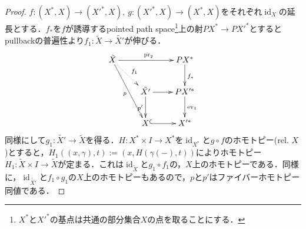 \documentclass[a4paper,11pt]{jsarticle}
\theoremstyle{definition}
\DeclareMathOperator{\id}{\mathrm{id}}
\begin{document}
\begin{proof}
  $f\colon (X^*,X)\to (X'^*,X),\ g\colon (X'^*,X)\to (X^*,X)$をそれぞれ$\id_X$の延長とする．$f_*$を$f$が誘導するpointed path space\footnote{$X^*$と$X'^*$の基点は共通の部分集合$X$の点を取ることにする．}上の射$PX^*\to PX'^*$とするとpullbackの普遍性より$f_1\colon \tilde{X}\to\tilde{X'}$が伸びる．
  \[\xymatrix{
    \tilde{X}\ar@{.>}[dr]^{f_1}\ar[ddr]_{p}\ar[rr]^{\mathrm{pr}_2}&&PX^*\ar[d]^{f_*}\\
    & \tilde{X'}\ar[d]_{p'}\ar[r]&PX'^*\ar[d]^{\mathrm{ev_1}}\\
    &X\ar@{^(->}[r]&X'^*
  }\]同様にして$g_1\colon \tilde{X'}\to\tilde{X}$を得る．$H\colon X^*\times I\to X^*$を$\id_{X^*}$と$g\circ f$のホモトピー(rel. $X$)とすると，$H_1((x,\gamma),t):=(x,H(\gamma(-),t))$によりホモトピー$H_1\colon\tilde{X}\times I\to \tilde X$が定まる．これは$\id_{\tilde{X}}$と$g_1\circ f_1$の，$X$上のホモトピーである．同様に，$\id_{\tilde{X'}}$と$f_1\circ g_1$の$X$上のホモトピーもあるので，$p$と$p'$はファイバーホモトピー同値である．
\end{proof}



\end{document}
